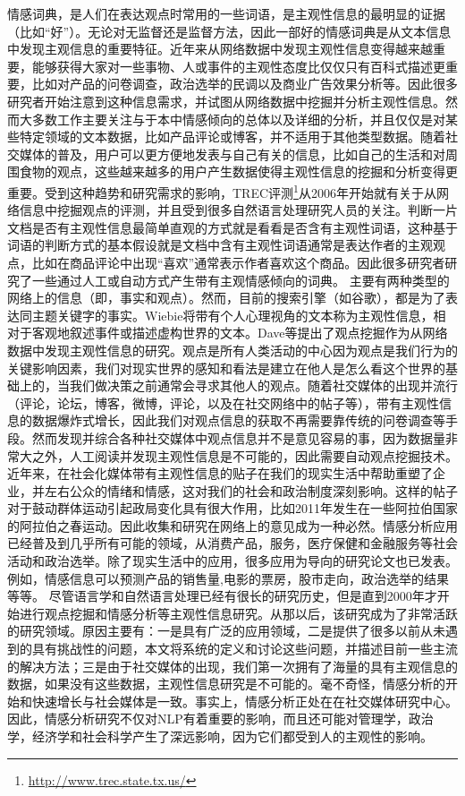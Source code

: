 情感词典，是人们在表达观点时常用的一些词语，是主观性信息的最明显的证据（比如``好''）。无论对无监督还是监督方法，因此一部好的情感词典是从文本信息中发现主观信息的重要特征。近年来从网络数据中发现主观性信息变得越来越重要，能够获得大家对一些事物、人或事件的主观性态度比仅仅只有百科式描述更重要，比如对产品的问卷调查，政治选举的民调以及商业广告效果分析等。因此很多研究者开始注意到这种信息需求，并试图从网络数据中挖掘并分析主观性信息。然而大多数工作主要关注与于本中情感倾向的总体以及详细的分析，并且仅仅是对某些特定领域的文本数据，比如产品评论或博客，并不适用于其他类型数据。随着社交媒体的普及，用户可以更方便地发表与自己有关的信息，比如自己的生活和对周围食物的观点，这些越来越多的用户产生数据使得主观性信息的挖掘和分析变得更重要。受到这种趋势和研究需求的影响，TREC评测\footnote{\url{http://www.trec.state.tx.us/}}从2006年开始就有关于从网络信息中挖掘观点的评测，并且受到很多自然语言处理研究人员的关注。判断一片文档是否有主观性信息最简单直观的方式就是看看是否含有主观性词语，这种基于词语的判断方式的基本假设就是文档中含有主观性词语通常是表达作者的主观观点，比如在商品评论中出现``喜欢''通常表示作者喜欢这个商品。因此很多研究者研究了一些通过人工或自动方式产生带有主观情感倾向的词典。
主要有两种类型的网络上的信息（即，事实和观点）。然而，目前的搜索引擎（如谷歌），都是为了表达同主题关键字的事实。Wiebie将带有个人心理视角的文本称为主观性信息，相对于客观地叙述事件或描述虚构世界的文本。Dave等提出了观点挖掘作为从网络数据中发现主观性信息的研究。观点是所有人类活动的中心因为观点是我们行为的关键影响因素，我们对现实世界的感知和看法是建立在他人是怎么看这个世界的基础上的，当我们做决策之前通常会寻求其他人的观点。随着社交媒体的出现并流行（评论，论坛，博客，微博，评论，以及在社交网络中的帖子等），带有主观性信息的数据爆炸式增长，因此我们对观点信息的获取不再需要靠传统的问卷调查等手段。然而发现并综合各种社交媒体中观点信息并不是意见容易的事，因为数据量非常大之外，人工阅读并发现主观性信息是不可能的，因此需要自动观点挖掘技术。近年来，在社会化媒体带有主观性信息的贴子在我们的现实生活中帮助重塑了企业，并左右公众的情绪和情感，这对我们的社会和政治制度深刻影响。这样的帖子对于鼓动群体运动引起政局变化具有很大作用，比如2011年发生在一些阿拉伯国家的阿拉伯之春运动。因此收集和研究在网络上的意见成为一种必然。情感分析应用已经普及到几乎所有可能的领域，从消费产品，服务，医疗保健和金融服务等社会活动和政治选举。除了现实生活中的应用，很多应用为导向的研究论文也已发表。例如，情感信息可以预测产品的销售量,电影的票房，股市走向，政治选举的结果等等。
尽管语言学和自然语言处理已经有很长的研究历史，但是直到2000年才开始进行观点挖掘和情感分析等主观性信息研究。从那以后，该研究成为了非常活跃的研究领域。原因主要有：一是具有广泛的应用领域，二是提供了很多以前从未遇到的具有挑战性的问题，本文将系统的定义和讨论这些问题，并描述目前一些主流的解决方法；三是由于社交媒体的出现，我们第一次拥有了海量的具有主观信息的数据，如果没有这些数据，主观性信息研究是不可能的。毫不奇怪，情感分析的开始和快速增长与社会媒体是一致。事实上，情感分析正处在在社交媒体研究中心。因此，情感分析研究不仅对NLP有着重要的影响，而且还可能对管理学，政治学，经济学和社会科学产生了深远影响，因为它们都受到人的主观性的影响。

